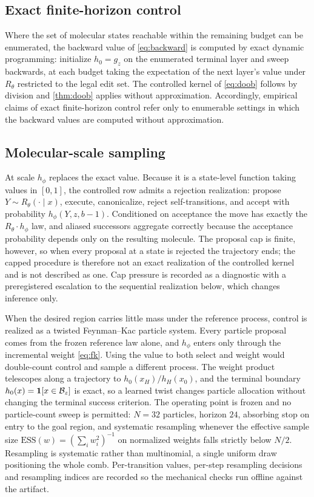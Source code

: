 \subsection{Exact finite-horizon control}

Where the set of molecular states reachable within the remaining budget can be enumerated, the backward value of \eqref{eq:backward} is computed by exact dynamic programming: initialize $h_0=g_z$ on the enumerated terminal layer and sweep backwards, at each budget taking the expectation of the next layer's value under $R_\theta$ restricted to the legal edit set. The controlled kernel of \eqref{eq:doob} follows by division and \cref{thm:doob} applies without approximation. Accordingly, empirical claims of exact finite-horizon control refer only to enumerable settings in which the backward values are computed without approximation.

\subsection{Molecular-scale sampling}

At scale $h_\phi$ replaces the exact value. Because it is a state-level function taking values in $[0,1]$, the controlled row admits a rejection realization: propose $Y\sim R_\theta(\cdot\mid x)$, execute, canonicalize, reject self-transitions, and accept with probability $h_\phi(Y,z,b-1)$. Conditioned on acceptance the move has exactly the $R_\theta\cdot h_\phi$ law, and aliased successors aggregate correctly because the acceptance probability depends only on the resulting molecule. The proposal cap is finite, however, so when every proposal at a state is rejected the trajectory ends; the capped procedure is therefore not an exact realization of the controlled kernel and is not described as one. Cap pressure is recorded as a diagnostic with a preregistered escalation to the sequential realization below, which changes inference only.

When the desired region carries little mass under the reference process, control is realized as a twisted Feynman--Kac particle system. Every particle proposal comes from the frozen reference law alone, and $h_\phi$ enters only through the incremental weight \eqref{eq:fk}. Using the value to both select and weight would double-count control and sample a different process. The weight product telescopes along a trajectory to $h_0(x_H)/h_H(x_0)$, and the terminal boundary $h_0(x)=\mathbf{1}[x\in\mathcal{B}_z]$ is exact, so a learned twist changes particle allocation without changing the terminal success criterion. The operating point is frozen and no particle-count sweep is permitted: $N=32$ particles, horizon $24$, absorbing stop on entry to the goal region, and systematic resampling whenever the effective sample size $\mathrm{ESS}(w)=(\sum_i w_i^2)^{-1}$ on normalized weights falls strictly below $N/2$. Resampling is systematic rather than multinomial, a single uniform draw positioning the whole comb. Per-transition values, per-step resampling decisions and resampling indices are recorded so the mechanical checks run offline against the artifact.

